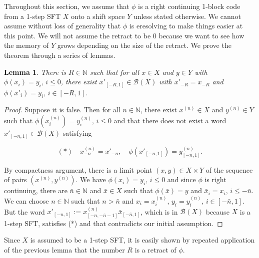 \documentclass[a4paper]{amsart}
\newtheorem{lem}[thm]{Lemma}
\theoremstyle{definition}
\numberwithin{equation}{section}
\numberwithin{figure}{section}
\theoremstyle{definition}
\theoremstyle{remark}
\begin{document}
Throughout this section, we assume that $\phi$ is a right continuing 1-block code from a 1-step SFT $X$ onto a shift space $Y$ unless stated otherwise. We cannot assume without loss of generality that $\phi$ is eresolving to make things easier at this point. We will not assume the retract to be 0 because we want to see how the memory of $Y$ grows depending on the size of the retract. We prove the theorem through a series of lemmas.

\begin{lem}\label{lem:i}
  There is $R \in \mathbb{N}$ such that for all $x\in X$ and $y \in Y$
  with $\phi(x_i)=y_i,\, i\le0$, there exist $x'_{[-R,1]} \in \mathcal
  B (X)$ with $x'_{-R} = x_{-R}$ and $\phi(x'_i) = y_i,\, i\in
  [-R,1]$.
\end{lem}
\begin{proof}
  Suppose it is false. Then for all $n \in \mathbb N$, there exist $x^{(n)}
  \in X$ and $y^{(n)} \in Y$ such that $\phi(x^{(n)}_i) = y^{(n)}_i,\,
  i\le0$ and that there does not exist a word $x'_{[-n,1]} \in
  \mathcal B (X)$ satisfying 

  \[(*) \quad x^{(n)}_{-n} = x'_{-n},\quad
  \phi(x'_{[-n,1]}) = y^{(n)}_{[-n,1]}.\]

  By compactness argument, there is a limit point $(x,y) \in X\times Y$  of the sequence of pairs
  $(x^{(n)}, y^{(n)})$. We have $\phi(x_i) = y_i,\, i\le0$ and since
  $\phi$ is right continuing, there are $\bar n \in \mathbb N$ and
  $\bar x \in X$ such that $\phi(\bar x) = y$ and $\bar x_i = x_i,\,
  i\le -\bar n$. We can choose $n\in \mathbb N$ such that $n > \bar n$
  and $x_i = x^{(n)}_i,\, y_i = y^{(n)}_i,\, i\in[-\bar n, 1]$.  But
  the word $x'_{[-n,1]} := x^{(n)}_{[-n,-\bar n -1]}\bar x_{[-\bar
    n,1]}$, which is in ${\mathcal B}(X)$ because $X$ is a 1-step SFT, satisfies (*) and that contradicts our initial assumption.
\end{proof}

Since $X$ is assumed to be a 1-step SFT, it is easily shown by repeated application of the previous lemma that the number $R$ is a retract of $\phi$.
\end{document}
